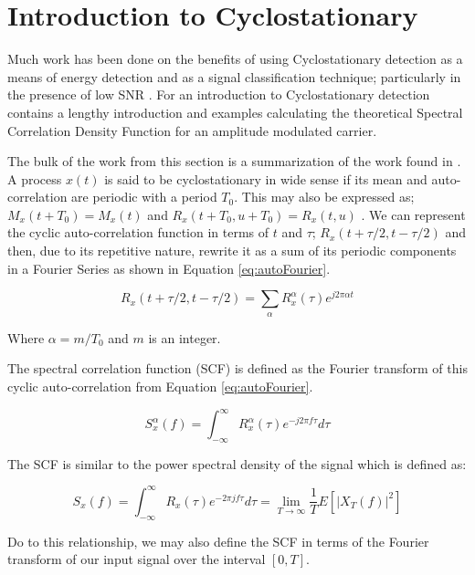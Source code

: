\section{Introduction to Cyclostationary}
\label{sec:cycloIntro}
Much work has been done on the benefits of using Cyclostationary detection as a
means of energy detection and as a signal classification
technique; particularly in the presence of low SNR \cite{kim2007}.  For an
introduction to Cyclostationary detection \cite{costa1996} contains a lengthy introduction and
examples calculating the theoretical Spectral Correlation Density Function for
an amplitude modulated carrier.

The bulk of the work from this section is a summarization of the work found in
\cite{kim2007}.  A process $x(t)$ is said to be cyclostationary in wide sense
if its mean and auto-correlation are periodic with a period $T_0$.  This may also be expressed as; $M_x(t+T_0) = M_x(t)$ and $R_x(t+T_0, u + T_0) = R_x(t,u)$ \cite{kim2007}. 
We can represent the cyclic auto-correlation function in terms of $t$ and
$\tau$; $R_x(t+\tau/2, t-\tau/2)$ and then, due to its repetitive nature,
rewrite it as a sum of its periodic components in a Fourier Series as shown in
Equation \ref{eq:autoFourier}.

\begin{equation}
R_x(t+\tau/2, t- \tau/2) = \sum_{\alpha} R_x^{\alpha}(\tau)e^{j2\pi \alpha t}
\label{eq:autoFourier}
\end{equation}

Where $\alpha = m/T_0$ and $m$ is an integer. 

The spectral correlation function (SCF) is defined as the Fourier transform of
this cyclic auto-correlation from Equation \ref{eq:autoFourier}.

\begin{equation}
S_x^{\alpha}(f) = \int_{-\infty}^{\infty} R_x^{\alpha}(\tau)e^{-j2\pi f \tau} d\tau
\label{eq:ScdDefined}
\end{equation}

The SCF is similar to the power spectral density of the signal which is defined
as: 

\begin{equation}
S_x(f) = \int_{-\infty}^{\infty} R_x(\tau)e^{-2\pi j f \tau} d\tau = \lim_{T \to \infty} \frac{1}{T}E[|X_T(f)|^2]
\label{eq:PSDDef}
\end{equation}


Do to this relationship, we may also define the SCF in terms of the Fourier
transform of our input signal over the interval $[0, T]$.

